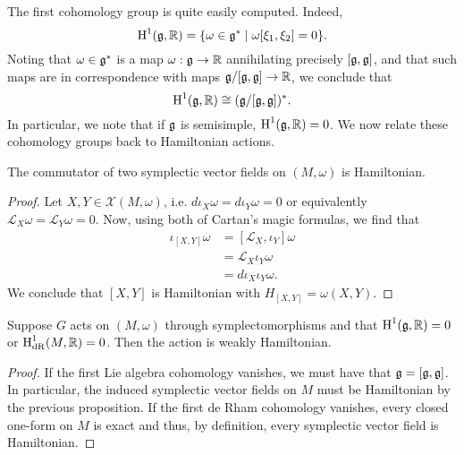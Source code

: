 \documentclass{amsart}
\begin{document}
The first cohomology group is quite easily computed. Indeed,
\begin{equation*}
    \operatorname{H}^1(\mathfrak g,\mathbb{R})=\{\omega\in\mathfrak g^*\mid \omega[\xi_1,\xi_2]=0\}.
\end{equation*}
Noting that $\omega\in\mathfrak g^*$ is a map $\omega:\mathfrak g\to\mathbb{R}$ annihilating precisely $[\mathfrak g,\mathfrak g]$,
and that such maps are in correspondence with maps $\mathfrak g/[\mathfrak g, \mathfrak g]\to\mathbb{R}$, we conclude that
\begin{equation*}
    \operatorname{H}^1(\mathfrak g,\mathbb{R}) \cong (\mathfrak g/[\mathfrak g, \mathfrak g])^*.
\end{equation*}
In particular, we note that if $\mathfrak g$ is semisimple, $\operatorname{H}^1(\mathfrak g,\mathbb{R})=0$.
We now relate these cohomology groups back to Hamiltonian actions.

\begin{proposition}
    The commutator of two symplectic vector fields on $(M,\omega)$ is Hamiltonian.
\end{proposition}
\begin{proof}
    Let $X,Y\in\mathcal{X}(M,\omega)$, i.e. $d\iota_X\omega=d\iota_Y\omega=0$ or equivalently
    $\mathcal{L}_X\omega=\mathcal{L}_Y\omega=0$. Now, using both of Cartan's magic formulas,
    we find that
    \begin{align*}
        \iota_{[X,Y]}\omega &= [\mathcal{L}_X,\iota_Y]\omega\\
        &= \mathcal{L}_X\iota_Y\omega\\
        &= d\iota_X\iota_Y\omega.
    \end{align*}
    We conclude that $[X,Y]$ is Hamiltonian with $H_{[X,Y]}=\omega(X,Y)$.
\end{proof}

\begin{corollary}
    Suppose $G$ acts on $(M,\omega)$ through symplectomorphisms and that 
    $\operatorname{H}^1(\mathfrak g,\mathbb{R})=0$ or $\operatorname{H}^1_\mathrm{dR}(M,\mathbb{R})=0$. Then the action is
    weakly Hamiltonian.
\end{corollary}
\begin{proof}
    If the first Lie algebra cohomology vanishes, we must have that $\mathfrak g=[\mathfrak g,\mathfrak g]$.
    In particular, the induced symplectic vector fields on $M$ must be Hamiltonian by
    the previous proposition. If the first de Rham cohomology vanishes, every closed one-form
    on $M$ is exact and thus, by definition, every symplectic vector field is Hamiltonian.
\end{proof}
\end{document}
